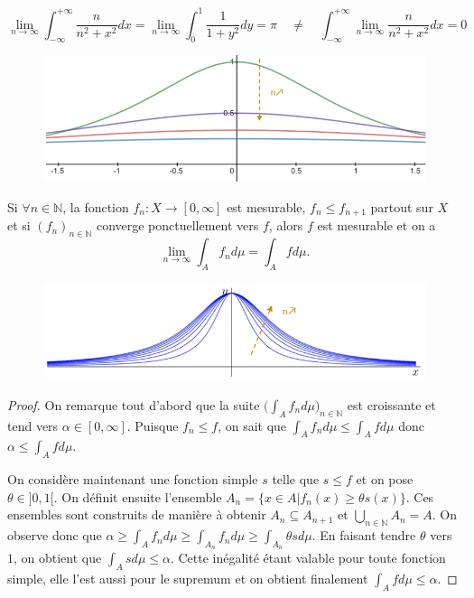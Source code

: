 \begin{example}
    \begin{equation*}
        \lim_{n\to\infty}\int_{-\infty}^{+\infty}\frac{n}{n^2+x^2}dx=\lim_{n\to\infty}\int_0^1\frac{1}{1+y^2}dy=\pi \quad\neq\quad\int_{-\infty}^{+\infty}\lim_{n\to\infty}\frac{n}{n^2+x^2}dx=0
    \end{equation*}
    \begin{figure}[H]
        \centering
        \includegraphics[scale = 0.6]{synthese_cm12_4.jpg}
    \end{figure}
\end{example}

\begin{theo}
    Si $\forall n\in\mathbb{N}$, la fonction $f_n:X\to[0,\infty]$ est mesurable, $f_n\leq f_{n+1}$ partout sur $X$ et si $(f_n)_{n\in\mathbb{N}}$ converge ponctuellement vers $f$, alors $f$ est mesurable et on a
    \begin{equation*}
        \lim\limits_{n\to\infty}\int_A f_nd\mu = \int_Afd\mu.
    \end{equation*}
    \begin{figure}[H]
        \centering
        \includegraphics{synthese_conv_monotone.PNG}
    \end{figure}
\end{theo}
\begin{proof}
    On remarque tout d'abord que la suite $\big(\int_Af_nd\mu\big)_{n\in\mathbb{N}}$ est croissante et tend vers $\alpha\in[0,\infty]$. Puisque $f_n\leq f$, on sait que $\int_Af_nd\mu\leq\int_Afd\mu$ donc $\alpha\leq\int_Afd\mu$.
    
    On considère maintenant une fonction simple $s$ telle que $s\leq f$ et on pose $\theta\in]0,1[$. On définit ensuite l'ensemble $A_n=\{x\in A\big|f_n(x)\geq\theta s(x)\}$. Ces ensembles sont construits de manière à obtenir $A_n\subseteq A_{n+1}$ et $\bigcup_{n\in\mathbb{N}}A_n=A$. On observe donc que $\alpha\geq\int_Af_nd\mu\geq\int_{A_n}f_nd\mu\geq\int_{A_n}\theta sd\mu$. En faisant tendre $\theta$ vers $1$, on obtient que $\int_Asd\mu\leq\alpha$. Cette inégalité étant valable pour toute fonction simple, elle l'est aussi pour le supremum et on obtient finalement $\int_A fd\mu\leq\alpha$.
\end{proof}

